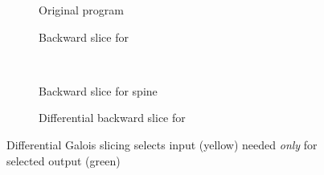 \begin{figure}
   \small
   \begin{centering}
      \begin{subfigure}{0.45\textwidth}
         {}
      \caption{Original program}
      \label{fig:example:diff-slicing:original}
      \end{subfigure}
      \begin{subfigure}{0.45\textwidth}
         {}
      \caption{Backward slice for }
      \label{fig:example:diff-slicing:subtree}
      \end{subfigure}
      \\
      \begin{subfigure}{0.45\textwidth}
         {}
      \caption{Backward slice for spine \kw{($\hole$, $\hole$)}}
      \label{fig:example:diff-slicing:spine}
      \end{subfigure}
      \begin{subfigure}{0.45\textwidth}
         {}
      \caption{Differential backward slice for }
      \label{fig:example:diff-slicing:differential}
      \end{subfigure}
   \end{centering}
   \caption{Differential Galois slicing selects input (yellow) needed \emph{only} for selected output (green)}
   \label{fig:example:diff-slicing}
\end{figure}
